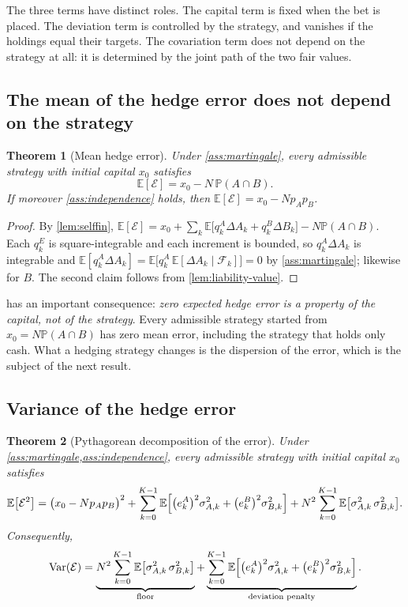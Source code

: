 \documentclass[11pt,a4paper]{article}
\theoremstyle{plain}
\newtheorem{theorem}{Theorem}[section]
\theoremstyle{definition}
\theoremstyle{remark}
\newcommand{\E}{\mathbb{E}}
\newcommand{\Prob}{\mathbb{P}}
\newcommand{\1}{\mathbf{1}}
\newcommand{\F}{\mathcal{F}}
\newcommand{\Var}{\operatorname{Var}}
\begin{document}
The three terms have distinct roles. The capital term is fixed when the bet is placed. The deviation term is controlled by the strategy, and vanishes if the holdings equal their targets. The covariation term does not depend on the strategy at all: it is determined by the joint path of the two fair values.

\subsection{The mean of the hedge error does not depend on the strategy}

\begin{theorem}[Mean hedge error]
\label{thm:mean}
Under \cref{ass:martingale}, every admissible strategy with initial capital $x_0$ satisfies
\[
\E[\mathcal{E}] = x_0 - N\,\Prob(A\cap B).
\]
If moreover \cref{ass:independence} holds, then $\E[\mathcal{E}] = x_0 - Np_Ap_B$.
\end{theorem}

\begin{proof}
By \cref{lem:selffin}, $\E[\mathcal{E}] = x_0 + \sum_k\E\bigl[q^A_k\Delta A_k + q^B_k\Delta B_k\bigr] - N\Prob(A\cap B)$. Each $q^E_k$ is square-integrable and each increment is bounded, so $q^A_k\Delta A_k$ is integrable and $\E[q^A_k\Delta A_k] = \E\bigl[q^A_k\,\E[\Delta A_k\mid\F_k]\bigr] = 0$ by \cref{ass:martingale}; likewise for $B$. The second claim follows from \cref{lem:liability-value}.
\end{proof}

 has an important consequence: \emph{zero expected hedge error is a property of the capital, not of the strategy}. Every admissible strategy started from $x_0 = N\Prob(A\cap B)$ has zero mean error, including the strategy that holds only cash. What a hedging strategy changes is the dispersion of the error, which is the subject of the next result.

\subsection{Variance of the hedge error}

\begin{theorem}[Pythagorean decomposition of the error]
\label{thm:pythagoras}
Under \cref{ass:martingale,ass:independence}, every admissible strategy with initial capital $x_0$ satisfies
\begin{equation}
\label{eq:pythagoras}
\E\bigl[\mathcal{E}^2\bigr] = \bigl(x_0 - Np_Ap_B\bigr)^2 + \sum_{k=0}^{K-1}\E\Bigl[\bigl(e^A_k\bigr)^2\sigma^2_{A,k} + \bigl(e^B_k\bigr)^2\sigma^2_{B,k}\Bigr] + N^2\sum_{k=0}^{K-1}\E\bigl[\sigma^2_{A,k}\,\sigma^2_{B,k}\bigr].
\end{equation}
Consequently,
\begin{equation}
\label{eq:variance}
\Var(\mathcal{E}) = \underbrace{N^2\sum_{k=0}^{K-1}\E\bigl[\sigma^2_{A,k}\,\sigma^2_{B,k}\bigr]}_{\text{floor}} + \underbrace{\sum_{k=0}^{K-1}\E\Bigl[\bigl(e^A_k\bigr)^2\sigma^2_{A,k} + \bigl(e^B_k\bigr)^2\sigma^2_{B,k}\Bigr]}_{\text{deviation penalty}}.
\end{equation}
\end{theorem}
\end{document}
